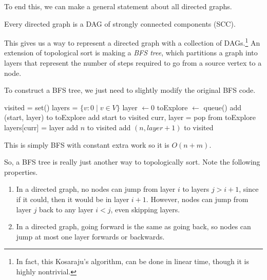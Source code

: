 \documentclass{article}
\begin{document}
    To end this, we can make a general statement about all directed graphs. 

    \begin{theorem}
      Every directed graph is a DAG of strongly connected components (SCC). 
    \end{theorem}

    This gives us a way to represent a directed graph with a collection of DAGs.\footnote{In fact, this Kosaraju's algorithm, can be done in linear time, though it is highly nontrivial.} An extension of topological sort is making a \textit{BFS tree}, which partitions a graph into layers that represent the number of steps required to go from a source vertex to a node. 

    \begin{algo}
      To construct a BFS tree, we just need to slightly modify the original BFS code.
      \begin{algorithm}[H]
        \label{alg:bfs_tree}
        \begin{algorithmic}[1]
          \State visited = set() 
          \State layers = $\{v : 0 \mid v \in V \}$
            \State layer $\gets 0$ 
            \State toExplore $\gets$ queue() 
            \State add (start, layer) to toExplore 
            \State add start to visited
              \State curr, layer = pop from toExplore 
              \State layers[curr] = layer 
                  \State add $n$ to visited 
                  \State add $(n, layer+1)$ to visited 
                \EndIf
              \EndFor
            \EndWhile 
          \EndFunction
        \end{algorithmic}
      \end{algorithm}
      This is simply BFS with constant extra work so it is $O(n + m)$. 
    \end{algo}

    So, a BFS tree is really just another way to topologically sort. Note the following properties. 
    \begin{enumerate}
      \item In a directed graph, no nodes can jump from layer $i$ to layers $j > i+1$, since if it could, then it would be in layer $i+1$. However, nodes can jump from layer $j$ back to any layer $i < j$, even skipping layers. 
      \item In a directed graph, going forward is the same as going back, so nodes can jump at most one layer forwards or backwards. 
    \end{enumerate}
\end{document}

